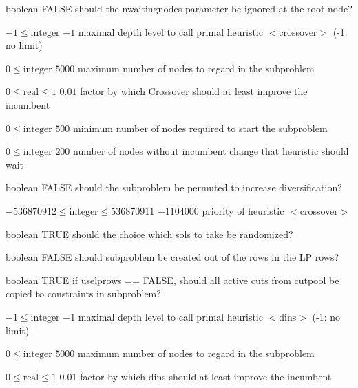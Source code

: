 %
{boolean}%
{FALSE}%
{should the nwaitingnodes parameter be ignored at the root node?}%
{}

%
{$-1\leq\textrm{integer}$}%
{$-1$}%
{maximal depth level to call primal heuristic $<$crossover$>$ (-1: no limit)}%
{}

%
{$0\leq\textrm{integer}$}%
{$5000$}%
{maximum number of nodes to regard in the subproblem}%
{}

%
{$0\leq\textrm{real}\leq1$}%
{$0.01$}%
{factor by which Crossover should at least improve the incumbent}%
{}

%
{$0\leq\textrm{integer}$}%
{$500$}%
{minimum number of nodes required to start the subproblem}%
{}

%
{$0\leq\textrm{integer}$}%
{$200$}%
{number of nodes without incumbent change that heuristic should wait}%
{}

%
{boolean}%
{FALSE}%
{should the subproblem be permuted to increase diversification?}%
{}

%
{$-536870912\leq\textrm{integer}\leq536870911$}%
{$-1104000$}%
{priority of heuristic $<$crossover$>$}%
{}

%
{boolean}%
{TRUE}%
{should the choice which sols to take be randomized?}%
{}

%
{boolean}%
{FALSE}%
{should subproblem be created out of the rows in the LP rows?}%
{}

%
{boolean}%
{TRUE}%
{if uselprows == FALSE, should all active cuts from cutpool be copied to constraints in subproblem?}%
{}

%
{$-1\leq\textrm{integer}$}%
{$-1$}%
{maximal depth level to call primal heuristic $<$dins$>$ (-1: no limit)}%
{}

%
{$0\leq\textrm{integer}$}%
{$5000$}%
{maximum number of nodes to regard in the subproblem}%
{}

%
{$0\leq\textrm{real}\leq1$}%
{$0.01$}%
{factor by which dins should at least improve the incumbent}%
{}

